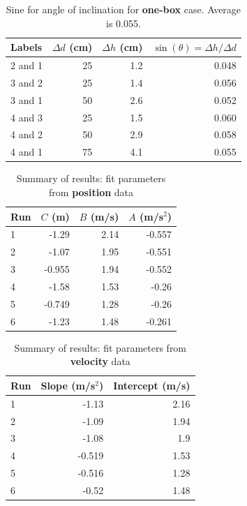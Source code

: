 \begin{table}[ht]
    \centering
    \begin{tabular}{|l|r|r|r|}
        \hline
        \textbf{Labels} & $\Delta d$ (cm) & $\Delta h$ (cm) & $\sin(\theta) = \Delta h / \Delta d$ \\
        \hline
        2 and 1 & 25 & 1.2 & 0.048 \\
        3 and 2 & 25 & 1.4 & 0.056 \\
        3 and 1 & 50 & 2.6 & 0.052 \\
        4 and 3 & 25 & 1.5 & 0.060 \\
        4 and 2 & 50 & 2.9 & 0.058 \\
        4 and 1 & 75 & 4.1 & 0.055 \\
        \hline
    \end{tabular}
    \caption{Sine for angle of inclination for \textbf{one-box} case. Average is 0.055.}
    \label{table:02.sine.1}
\end{table}
\begin{table}[ht]
    \centering
    \begin{tabular}{|l|r|r|r|}
        \hline
        \textbf{Run} & $C$ (m) & $B$ (m/s) & $A$ (m/s$^{2}$) \\
        \hline
        1 & -1.29 & 2.14 & -0.557 \\
        2 & -1.07 & 1.95 & -0.551 \\
        3 & -0.955 & 1.94 & -0.552 \\
        \hline
        4 & -1.58 & 1.53 & -0.26 \\
        5 & -0.749 & 1.28 & -0.26 \\
        6 & -1.23 & 1.48 & -0.261 \\
        \hline
    \end{tabular}
    \caption{Summary of results: fit parameters from \textbf{position} data}
    \label{table:02.fit.d}
\end{table}
\begin{table}[ht]
    \centering
    \begin{tabular}{|l|r|r|}
        \hline
        \textbf{Run} & \textbf{Slope} (m/s$^{2}$) & \textbf{Intercept} (m/s) \\
        \hline
        1 & -1.13 & 2.16 \\
        2 & -1.09 & 1.94 \\
        3 & -1.08 & 1.9 \\
        \hline
        4 & -0.519 & 1.53 \\
        5 & -0.516 & 1.28 \\
        6 & -0.52 & 1.48 \\
        \hline
    \end{tabular}
    \caption{Summary of results: fit parameters from \textbf{velocity} data}
    \label{table:02.fit.v}
\end{table}
